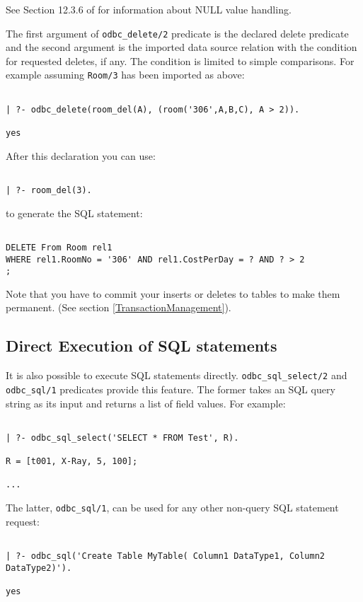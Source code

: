 See Section 12.3.6 of \cite{xsb-manual} for information about NULL value
handling.

The first argument of {\tt odbc\_delete/2} predicate is the declared delete
predicate and the second argument is the imported data source relation
with the condition for requested deletes, if any.  The condition is
limited to simple comparisons.  For example assuming
{\tt Room/3} has been imported as above:
\begin{verbatim}

| ?- odbc_delete(room_del(A), (room('306',A,B,C), A > 2)). 

yes
\end{verbatim}

After this declaration you can use:
\begin{verbatim}

| ?- room_del(3).
\end{verbatim}

to generate the SQL statement:
\begin{verbatim}

DELETE From Room rel1 
WHERE rel1.RoomNo = '306' AND rel1.CostPerDay = ? AND ? > 2
;
\end{verbatim}

Note that you have to commit your inserts or deletes to tables to make
them permanent.  (See section \ref{TransactionManagement}).

\subsection{ Direct Execution of SQL statements}
It is also possible to execute SQL statements directly. 
{\tt odbc\_sql\_select/2} and {\tt odbc\_sql/1} predicates provide this 
feature.  The former takes an SQL query string as its input and returns 
a list of field values.  For example:
\begin{verbatim}

| ?- odbc_sql_select('SELECT * FROM Test', R).

R = [t001, X-Ray, 5, 100];

...

\end{verbatim}
The latter, {\tt odbc\_sql/1}, can be used for any other non-query SQL statement request:
\begin{verbatim}

| ?- odbc_sql('Create Table MyTable( Column1 DataType1, Column2 DataType2)').

yes
\end{verbatim}


